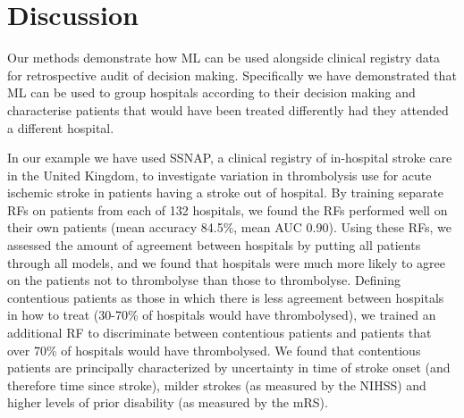\documentclass[12pt,a4paper, pdftex]{elsarticle}
\begin{document}
\section{Discussion}

Our methods demonstrate how ML can be used alongside clinical registry data for retrospective audit of decision making. Specifically we have demonstrated that ML can be used to group hospitals according to their decision making and characterise patients that would have been treated differently had they attended a different hospital. 

In our example we have used SSNAP, a clinical registry of in-hospital stroke care in the United Kingdom, to investigate variation in thrombolysis use for acute ischemic stroke in patients having a stroke out of hospital. By training separate RFs on patients from each of 132 hospitals, we found the RFs performed well on their own patients (mean accuracy 84.5\%, mean AUC 0.90). Using these RFs, we assessed the amount of agreement between hospitals by putting all patients through all models, and we found that hospitals were much more likely to agree on the patients not to thrombolyse than those to thrombolyse. Defining contentious patients as those in which there is less agreement between hospitals in how to treat (30-70\% of hospitals would have thrombolysed), we trained an additional RF to discriminate between contentious patients and patients that over 70\% of hospitals would have thrombolysed. We found that contentious patients are principally characterized by uncertainty in time of stroke onset (and therefore time since stroke), milder strokes (as measured by the NIHSS) and higher levels of prior disability (as measured by the mRS). 
\end{document}
